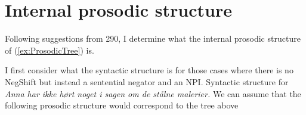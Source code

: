\documentclass[12pt, letterpaper]{article}
\begin{document}
\section{Internal prosodic structure}

\ea Following suggestions from 290, I determine what the internal prosodic structure of (\ref{ex:ProsodicTree}) is.

\ex I first consider what the syntactic structure is for those cases where there is no NegShift but instead a sentential negator and an NPI. 
\pagebreak
\ex Syntactic structure for \textit{Anna har ikke hørt noget i sagen om de stålne malerier.}
	\ea 
	\z 
\pagebreak
\ex We can assume that the following prosodic structure would correspond to the tree above
	\ea
	\z 
\end{document}
